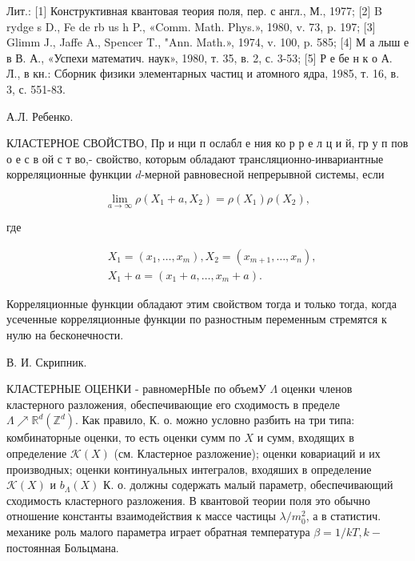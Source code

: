 \documentclass[10pt]{article}
\begin{document}
Лит.: [1] Конструктивная квантовая теория поля, пер. с англ., М., 1977; [2] B rydge s D., Fe de rb us h P., «Comm. Math. Phys.», 1980, v. 73, p. 197; [3] Glimm J., Jaffe A., Spencer T., "Ann. Math.», 1974, v. 100, p. 585; [4] М а лыш е в В. А., «Успехи математич. наук», 1980, т. 35, в. 2, с. 3-53; [5] Р е бе н к о А. Л., в кн.: Сборник физики элементарных частиц и атомного ядра, 1985, т. 16, в. 3, с. 551-83.



А.Л. Ребенко.



КЛАСТЕРНОЕ СВОЙСТВО, Пр и нци п ослабл е ния ко р р е л ц и й, гр у п пов о е с в ой с т во,- свойство, которым обладают трансляционно-инвариантные корреляционные функции $d$-мерной равновесной непрерывной системы, если



\[

\lim _{a \rightarrow \infty} \rho\left(X_{1}+a, X_{2}\right)=\rho\left(X_{1}\right) \rho\left(X_{2}\right),

\]



где



\[

\begin{aligned}

& X_{1}=\left(x_{1}, \ldots, x_{m}\right), X_{2}=\left(x_{m+1}, \ldots, x_{n}\right), \\

& X_{1}+a=\left(x_{1}+a, \ldots, x_{m}+a\right) .

\end{aligned}

\]



Корреляционные функции обладают этим свойством тогда и только тогда, когда усеченные корреляционные функции по разностным переменным стремятся к нулю на бесконечности.



В. И. Скрипник.



КЛАСТЕРНЫЕ ОЦЕНКИ - равномерНЫе по объемУ $\Lambda$ оценки членов кластерного разложения, обеспечивающие его сходимость в пределе $\Lambda \nearrow \mathbb{R}^{d}\left(\mathbb{Z}^{d}\right)$. Как правило, К. о. можно условно разбить на три типа: комбинаторные оценки, то есть оценки сумм по $X$ и сумм, входящих в определение $\mathcal{K}(X)$ (см. Кластерное разложение); оценки ковариаций и их производных; оценки континуальных интегралов, входяших в определение $\mathscr{K}(X)$ и $b_{\Lambda}(X)$ К. о. должны содержать малый параметр, обеспечивающий сходимость кластерного разложения. В квантовой теории поля это обычно отношение константы взаимодействия к массе частицы $\lambda / m_{0}^{2}$, а в статистич. механике роль малого параметра играет обратная температура $\beta=1 / k T, k-$ постоянная Больцмана.
\end{document}
